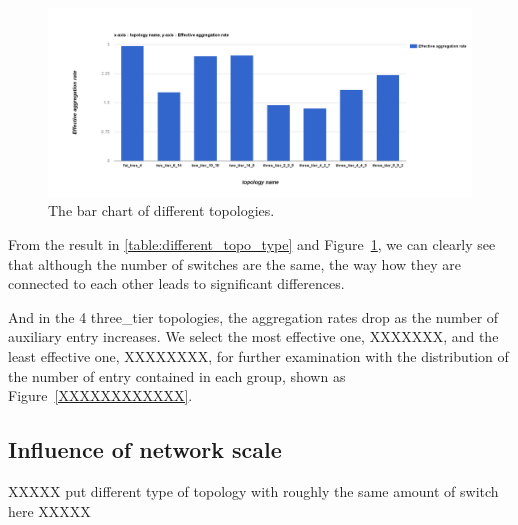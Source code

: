 \begin{figure}[H]
\begin{center} 
\includegraphics[width=1.4\linewidth]{figures/exp_topotype_bar.png}
\end{center}
\caption{The bar chart of different topologies.}
\label{different_topo_bar}
\end{figure}

From the result in \ref{table:different_topo_type} and Figure~\ref{different_topo_bar}, we can clearly see that although the number of switches are the same, the way how they are connected to each other leads to significant differences. 

And in the 4 three\_tier topologies, the aggregation rates drop as the number of auxiliary entry increases.
We select the most effective one, XXXXXXX, and the least effective one, XXXXXXXX, for further examination with the distribution of the number of entry contained in each group, shown as Figure~\ref{XXXXXXXXXXXX}.



\subsection{Influence of network scale}
XXXXX put different type of topology with roughly the same amount of switch here XXXXX

